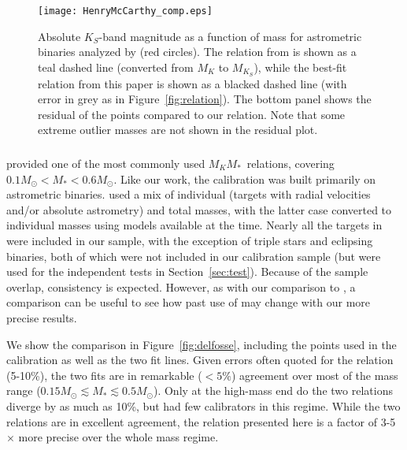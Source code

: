 \documentclass[twocolumn]{aastex62}
\newcommand{\mmkc}{$M_{K}$\textendash$M_*$}
\begin{document}
\begin{figure}[htb]
\begin{center}
\texttt{[image: HenryMcCarthy\_comp.eps]}
\caption{Absolute $K_S$-band magnitude as a function of mass for astrometric binaries analyzed by \citet{Hen1993} (red circles). The relation from \citet{Hen1993} is shown as a teal dashed line (converted from $M_K$ to $M_{K_S}$), while the best-fit relation from this paper is shown as a blacked dashed line (with error in grey as in Figure~\ref{fig:relation}). The bottom panel shows the residual of the \citet{Hen1993} points compared to our relation. Note that some extreme outlier masses are not shown in the residual plot. }
\label{fig:henry}
\end{center}
\end{figure}

\subsubsection{\citet{Delfosse2000}}

\citet{Delfosse2000} provided one of the most commonly used \mmkc\ relations, covering $0.1M_\odot<M_*<0.6M_\odot$. Like our work, the calibration was built primarily on astrometric binaries. \citet{Delfosse2000} used a mix of individual (targets with radial velocities and/or absolute astrometry) and total masses, with the latter case converted to individual masses using models available at the time. Nearly all the targets in \citet{Delfosse2000} were included in our sample, with the exception of triple stars and eclipsing binaries, both of which were not included in our calibration sample (but were used for the independent tests in Section~\ref{sec:test}). Because of the sample overlap, consistency is expected. However, as with our comparison to \citet{Hen1993}, a comparison can be useful to see how past use of \citet{Delfosse2000} may change with our more precise results.

We show the comparison in Figure~\ref{fig:delfosse}, including the points used in the \citet{Delfosse2000} calibration as well as the two fit lines. Given errors often quoted for the \citet{Delfosse2000} relation (5-10\%), the two fits are in remarkable ($<5\%$) agreement over most of the mass range ($0.15M_\odot \lesssim M_* \lesssim 0.5M_\odot$). Only at the high-mass end do the two relations diverge by as much as 10\%, but \citet{Delfosse2000} had few calibrators in this regime. While the two relations are in excellent agreement, the relation presented here is a factor of 3-5$\times$ more precise over the whole mass regime. 
\end{document}
